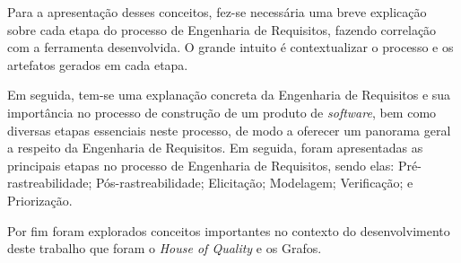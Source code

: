Para a apresentação desses conceitos, fez-se necessária uma breve explicação sobre cada etapa do processo de Engenharia de Requisitos, fazendo correlação com a ferramenta desenvolvida. O grande intuito é contextualizar o processo e os artefatos gerados em cada etapa.

Em seguida, tem-se uma explanação concreta da Engenharia de Requisitos e sua importância no processo de construção de um produto de \textit{software}, bem como diversas etapas essenciais neste processo, de modo a oferecer um panorama geral a respeito da Engenharia de Requisitos. Em seguida, foram apresentadas as principais etapas no processo de Engenharia de Requisitos, sendo elas: Pré-rastreabilidade; Pós-rastreabilidade; Elicitação; Modelagem; Verificação; e Priorização.

Por fim foram explorados conceitos importantes no contexto do desenvolvimento deste trabalho que foram o \textit{House of Quality} e os Grafos.